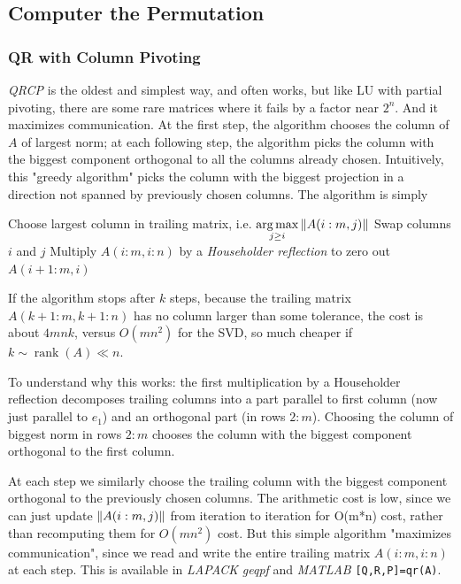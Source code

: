 \documentclass[11pt]{article}
\numberwithin{equation}{section}
\begin{document}
\subsection{Computer the Permutation}
\subsubsection{QR with Column Pivoting}
\textit{QRCP} is the oldest and simplest way, and often works, but like LU with partial pivoting, there are some rare matrices where it fails by a factor near $2^n$. 
And it maximizes communication. At the first step, the algorithm chooses the column of $A$ of largest norm;
at each following step, the algorithm picks the column with the biggest component orthogonal to all the columns already chosen.
Intuitively, this "greedy algorithm" picks the column with the biggest projection in a direction not spanned by previously chosen columns.
The algorithm is simply
\begin{algorithmfrm}[QRCP]
    \begin{algorithmic}
        \State Choose largest column in trailing matrix, i.e. $\underset{j \geq i}{\arg \max} \left\| A(i:m,j) \right\|$
            \State Swap columns $i$ and $j$
        \EndIf
        \State Multiply $A(i:m,i:n)$ by a \textit{Householder reflection} to zero out $A(i+1:m,i)$
        \EndFor
    \end{algorithmic}
\end{algorithmfrm}

If the algorithm stops after $k$ steps, because the trailing matrix $A(k+1:m,k+1:n)$ has no column larger than some tolerance, the cost is about $4mnk$, 
versus $O(mn^2)$ for the SVD, so much cheaper if $k \sim \operatorname{rank}(A) \ll n$.

To understand why this works: the first multiplication by a Householder reflection decomposes trailing columns into a part parallel to first column 
(now just parallel to $e_1$) and an orthogonal part (in rows $2:m$). Choosing the column of biggest norm in rows $2:m$ chooses the column with the biggest
component orthogonal to the first column.

At each step we similarly choose the trailing column with the biggest component orthogonal to the previously chosen columns.
The arithmetic cost is low, since we can just update $\left\| A(i:m,j) \right\|$ from iteration to iteration for O(m*n) cost, rather than recomputing them for $O(mn^2)$ cost.
But this simple algorithm "maximizes communication", since we read and write the entire trailing matrix $A(i:m,i:n)$ at each step. 
This is available in \textit{LAPACK} \textit{geqpf} and \textit{MATLAB} \texttt{[Q,R,P]=qr(A)}.
\end{document}
